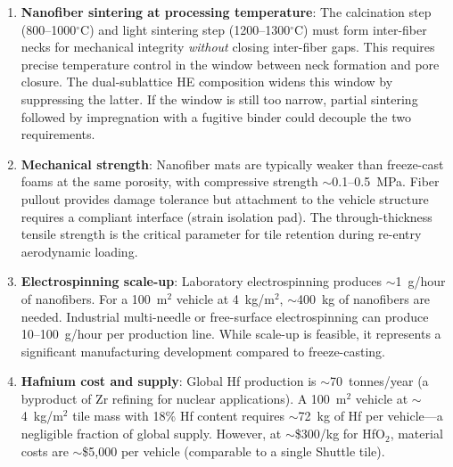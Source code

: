 \documentclass[12pt,letterpaper]{article}
\theoremstyle{definition}
\begin{document}
\begin{enumerate}
  \item \textbf{Nanofiber sintering at processing temperature}: The calcination step (800--1000$^\circ$C) and light sintering step (1200--1300$^\circ$C) must form inter-fiber necks for mechanical integrity \emph{without} closing inter-fiber gaps.  This requires precise temperature control in the window between neck formation and pore closure.  The dual-sublattice HE composition widens this window by suppressing the latter.  If the window is still too narrow, partial sintering followed by impregnation with a fugitive binder could decouple the two requirements.

  \item \textbf{Mechanical strength}: Nanofiber mats are typically weaker than freeze-cast foams at the same porosity, with compressive strength $\sim$0.1--0.5~MPa.  Fiber pullout provides damage tolerance but attachment to the vehicle structure requires a compliant interface (strain isolation pad).  The through-thickness tensile strength is the critical parameter for tile retention during re-entry aerodynamic loading.

  \item \textbf{Electrospinning scale-up}: Laboratory electrospinning produces $\sim$1~g/hour of nanofibers.  For a 100~m$^2$ vehicle at 4~kg/m$^2$, $\sim$400~kg of nanofibers are needed.  Industrial multi-needle or free-surface electrospinning can produce 10--100~g/hour per production line.  While scale-up is feasible, it represents a significant manufacturing development compared to freeze-casting.

  \item \textbf{Hafnium cost and supply}: Global Hf production is $\sim$70~tonnes/year (a byproduct of Zr refining for nuclear applications).  A 100~m$^2$ vehicle at $\sim$4~kg/m$^2$ tile mass with 18\% Hf content requires $\sim$72~kg of Hf per vehicle---a negligible fraction of global supply.  However, at $\sim$\$300/kg for HfO$_2$, material costs are $\sim$\$5,000 per vehicle (comparable to a single Shuttle tile).


\end{enumerate}
\end{document}
